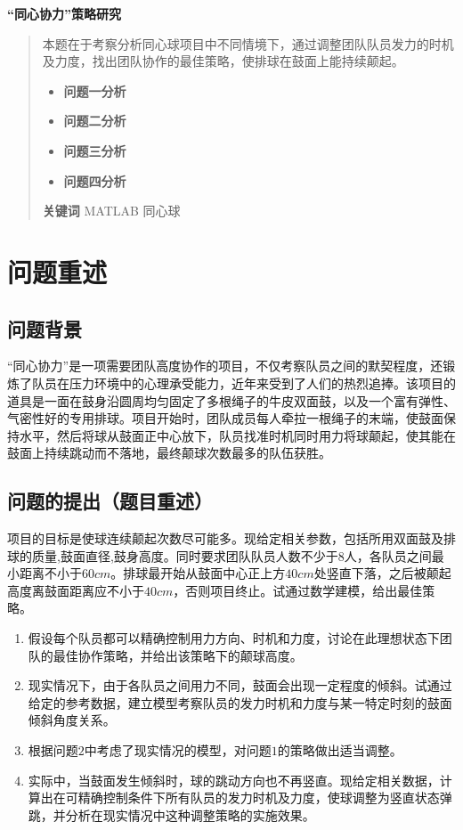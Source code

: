 \documentclass{cumcm}
\begin{document}
\begin{minipage}{0.9\textwidth}
\centering\LARGE\textbf{“同心协力”策略研究}

\end{minipage}
\begin{abstract}
本题在于考察分析同心球项目中不同情境下，通过调整团队队员发力的时机及力度，找出团队协作的最佳策略，使排球在鼓面上能持续颠起。\par
\begin{itemize}
\item \textbf{问题一分析}\quad\\
\item \textbf{问题二分析}\quad\\
\item \textbf{问题三分析}\quad\\
\item \textbf{问题四分析}\quad\\
\end{itemize}
\textbf{关键词} \quad MATLAB \quad 同心球 \quad 
\end{abstract}

\newpage
\section{问题重述}
\subsection{问题背景}
“同心协力”是一项需要团队高度协作的项目，不仅考察队员之间的默契程度，还锻炼了队员在压力环境中的心理承受能力，近年来受到了人们的热烈追捧。该项目的道具是一面在鼓身沿圆周均匀固定了多根绳子的牛皮双面鼓，以及一个富有弹性、气密性好的专用排球。项目开始时，团队成员每人牵拉一根绳子的末端，使鼓面保持水平，然后将球从鼓面正中心放下，队员找准时机同时用力将球颠起，使其能在鼓面上持续跳动而不落地，最终颠球次数最多的队伍获胜。
\subsection{问题的提出（题目重述）}
项目的目标是使球连续颠起次数尽可能多。现给定相关参数，包括所用双面鼓及排球的质量,鼓面直径,鼓身高度。同时要求团队队员人数不少于$8$人，各队员之间最小距离不小于$60cm$。排球最开始从鼓面中心正上方$40cm$处竖直下落，之后被颠起高度离鼓面距离应不小于$40cm$，否则项目终止。试通过数学建模，给出最佳策略。
\begin{enumerate}[(1)]
\item 假设每个队员都可以精确控制用力方向、时机和力度，讨论在此理想状态下团队的最佳协作策略，并给出该策略下的颠球高度。
\item 现实情况下，由于各队员之间用力不同，鼓面会出现一定程度的倾斜。试通过给定的参考数据，建立模型考察队员的发力时机和力度与某一特定时刻的鼓面倾斜角度关系。
\item 根据问题$2$中考虑了现实情况的模型，对问题$1$的策略做出适当调整。
\item 实际中，当鼓面发生倾斜时，球的跳动方向也不再竖直。现给定相关数据，计算出在可精确控制条件下所有队员的发力时机及力度，使球调整为竖直状态弹跳，并分析在现实情况中这种调整策略的实施效果。
\end{enumerate}
\end{document}
